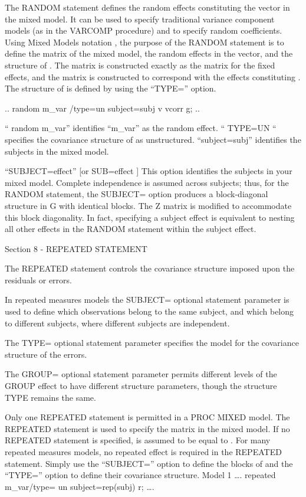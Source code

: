 The RANDOM statement defines the random effects constituting the   vector in the mixed model. 
It can be used to specify traditional variance component models (as in the VARCOMP procedure) and to specify random coefficients.
Using Mixed Models notation , the purpose of the RANDOM statement is to define the   matrix of the mixed model, the random effects in the  vector, and the structure of  . 
The  matrix is constructed exactly as the  matrix for the fixed effects, and the  matrix is constructed to correspond with the effects constituting  . 
The structure of  is defined by using the “TYPE=” option. 

..
random m_var /type=un subject=subj v vcorr g;
..

“ random m_var” identifies “m_var” as the random effect.
“ TYPE=UN “ specifies the covariance structure of   as unstructured.
“subject=subj” identifies the subjects in the mixed model.

“SUBJECT=effect” 		[or SUB=effect ]
This option identifies the subjects in your mixed model. Complete independence is assumed across subjects; thus, for the RANDOM statement, the SUBJECT= option produces a block-diagonal structure in G with identical blocks. 
The Z matrix is modified to accommodate this block diagonality. 
In fact, specifying a subject effect is equivalent to nesting all other effects in the RANDOM statement within the subject effect. 







Section 8 - REPEATED STATEMENT

The REPEATED statement controls the covariance structure imposed upon the residuals or errors.

In repeated measures models the SUBJECT= optional statement parameter is used to define which observations belong to the same subject, and which belong to different subjects, where different subjects are independent. 

The TYPE= optional statement parameter specifies the model for the covariance structure of the errors. 

The GROUP= optional statement parameter permits different levels of the GROUP effect to have different structure parameters, though the structure TYPE remains the same. 

Only one REPEATED statement is permitted in a PROC MIXED model.
The REPEATED statement is used to specify the   matrix in the mixed model. 
If no REPEATED statement is specified,  is assumed to be equal to  .
For many repeated measures models, no repeated effect is required in the REPEATED statement. Simply use the “SUBJECT=” option to define the blocks of   and the “TYPE=” option to define their covariance structure.
Model 1
….
repeated m_var/type= un subject=rep(subj) r;
….

